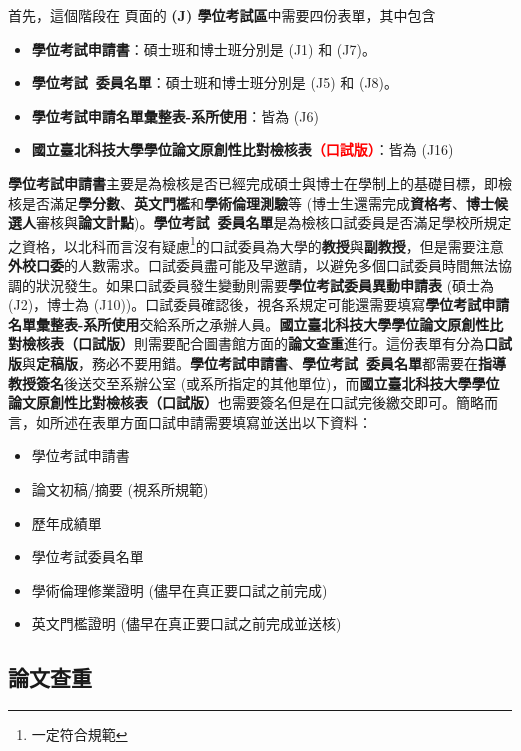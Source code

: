 \documentclass[12pt]{report}
\theoremstyle{plain}
\begin{document}
首先，這個階段在 \cite{ntutsheet} 頁面的 \textbf{(J) 學位考試區}中需要四份表單，其中包含
\begin{itemize}
    \item \textbf{學位考試申請書}：碩士班和博士班分別是 (J1) 和 (J7)。
    \item \textbf{學位考試\ 委員名單}：碩士班和博士班分別是 (J5) 和 (J8)。
    \item \textbf{學位考試申請名單彙整表-系所使用}：皆為 (J6)
    \item \textbf{國立臺北科技大學學位論文原創性比對檢核表\textcolor{red}{（口試版）}}：皆為 (J16)
\end{itemize}
\textbf{學位考試申請書}主要是為檢核是否已經完成碩士與博士在學制上的基礎目標，即檢核是否滿足\textbf{學分數}、\textbf{英文門檻}和\textbf{學術倫理測驗}等 (博士生還需完成\textbf{資格考}、\textbf{博士候選人}審核與\textbf{論文計點})。\textbf{學位考試\ 委員名單}是為檢核口試委員是否滿足學校所規定之資格，以北科而言沒有疑慮\footnote{一定符合規範}的口試委員為大學的\textbf{教授}與\textbf{副教授}，但是需要注意\textbf{外校口委}的人數需求。口試委員盡可能及早邀請，以避免多個口試委員時間無法協調的狀況發生。如果口試委員發生變動則需要\textbf{學位考試委員異動申請表} (碩士為 (J2)，博士為 (J10))。口試委員確認後，視各系規定可能還需要填寫\textbf{學位考試申請名單彙整表-系所使用}交給系所之承辦人員。\textbf{國立臺北科技大學學位論文原創性比對檢核表{（口試版）}}則需要配合圖書館方面的\textbf{論文查重}進行。這份表單有分為\textbf{口試版}與\textbf{定稿版}，務必不要用錯。\textbf{學位考試申請書}、\textbf{學位考試\ 委員名單}都需要在\textbf{指導教授簽名}後送交至系辦公室 (或系所指定的其他單位)，而\textbf{國立臺北科技大學學位論文原創性比對檢核表{（口試版）}}也需要簽名但是在口試完後繳交即可。簡略而言，如\cite{ntutfinal}所述在表單方面口試申請需要填寫並送出以下資料：
\begin{itemize}
    \item 學位考試申請書
    \item 論文初稿/摘要 (視系所規範)
    \item 歷年成績單
    \item 學位考試委員名單
    \item 學術倫理修業證明 (儘早在真正要口試之前完成)
    \item 英文門檻證明 (儘早在真正要口試之前完成並送核)
\end{itemize}

\subsection{論文查重}
\end{document}
